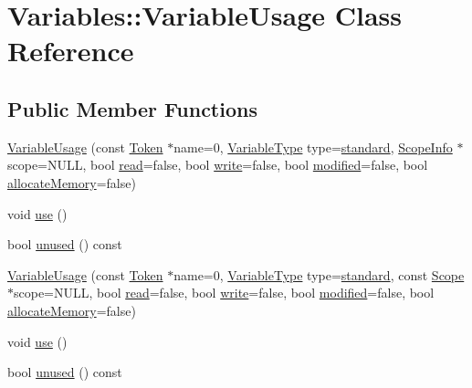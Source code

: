 \hypertarget{class_variables_1_1_variable_usage}{\section{Variables\-:\-:Variable\-Usage Class Reference}
\label{class_variables_1_1_variable_usage}
}
\subsection*{Public Member Functions}
\begin{DoxyCompactItemize}
\item 
\hyperlink{class_variables_1_1_variable_usage_a831e53f8072ab16f48c5c3805a9cd721}{Variable\-Usage} (const \hyperlink{class_token}{Token} $\ast$name=0, \hyperlink{class_variables_a1ce977f31f855a0966511a93b9deb9b6}{Variable\-Type} type=\hyperlink{class_variables_a1ce977f31f855a0966511a93b9deb9b6aa34a76d3845e9a44b518da0d2026adc3}{standard}, \hyperlink{class_scope_info}{Scope\-Info} $\ast$scope=N\-U\-L\-L, bool \hyperlink{class_variables_ab88a423ae0e238a45ecbdf6f2f21f524}{read}=false, bool \hyperlink{class_variables_a8998a3dfc5cd4e073b67b314c92f59f3}{write}=false, bool \hyperlink{class_variables_a1c4d49dba6f320283d1b068daad65ba2}{modified}=false, bool \hyperlink{class_variables_a5a93b5a3558b8f65747ff749c633a757}{allocate\-Memory}=false)
\item 
void \hyperlink{class_variables_1_1_variable_usage_a16a66659070f51af3a0c58ea42e4e6ea}{use} ()
\item 
bool \hyperlink{class_variables_1_1_variable_usage_a19efa9be3996f8fbac3e3053704d519b}{unused} () const 
\item 
\hyperlink{class_variables_1_1_variable_usage_ae35ef17af78b6c94d73c74866b06fdc6}{Variable\-Usage} (const \hyperlink{class_token}{Token} $\ast$name=0, \hyperlink{class_variables_a1ce977f31f855a0966511a93b9deb9b6}{Variable\-Type} type=\hyperlink{class_variables_a1ce977f31f855a0966511a93b9deb9b6aa34a76d3845e9a44b518da0d2026adc3}{standard}, const \hyperlink{class_scope}{Scope} $\ast$scope=N\-U\-L\-L, bool \hyperlink{class_variables_ab88a423ae0e238a45ecbdf6f2f21f524}{read}=false, bool \hyperlink{class_variables_a8998a3dfc5cd4e073b67b314c92f59f3}{write}=false, bool \hyperlink{class_variables_a1c4d49dba6f320283d1b068daad65ba2}{modified}=false, bool \hyperlink{class_variables_a5a93b5a3558b8f65747ff749c633a757}{allocate\-Memory}=false)
\item 
void \hyperlink{class_variables_1_1_variable_usage_a16a66659070f51af3a0c58ea42e4e6ea}{use} ()
\item 
bool \hyperlink{class_variables_1_1_variable_usage_a19efa9be3996f8fbac3e3053704d519b}{unused} () const 
\end{DoxyCompactItemize}
